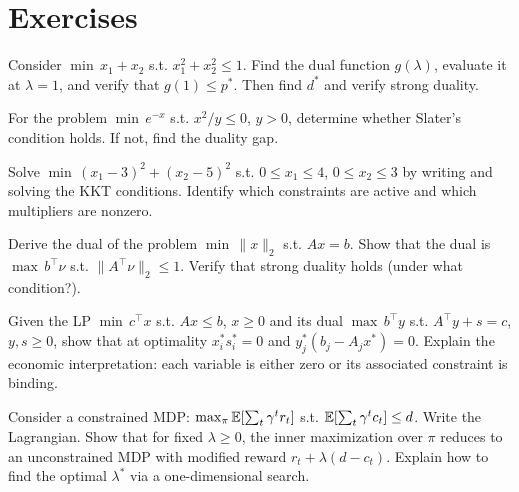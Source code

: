 \documentclass[11pt,a4paper]{article}
\begin{document}

\section{Exercises}\label{sec:exercises}

\begin{exercise}\label{ex:wd-bound}
Consider $\min\, x_1 + x_2$ s.t. $x_1^2 + x_2^2 \le 1$. Find the dual
function $g(\lambda)$, evaluate it at $\lambda = 1$, and verify that
$g(1) \le p^*$. Then find $d^*$ and verify strong duality.
\end{exercise}

\begin{exercise}\label{ex:slater-check}
For the problem $\min\, e^{-x}$ s.t. $x^2/y \le 0$, $y > 0$, determine
whether Slater's condition holds. If not, find the duality gap.
\end{exercise}

\begin{exercise}\label{ex:kkt-box}
Solve $\min\, (x_1 - 3)^2 + (x_2 - 5)^2$ s.t. $0 \le x_1 \le 4$,
$0 \le x_2 \le 3$ by writing and solving the KKT conditions. Identify
which constraints are active and which multipliers are nonzero.
\end{exercise}

\begin{exercise}\label{ex:dual-norm}
Derive the dual of the problem $\min\, \|x\|_2$ s.t. $Ax = b$.
Show that the dual is $\max\, b^\top \nu$ s.t. $\|A^\top \nu\|_2 \le 1$.
Verify that strong duality holds (under what condition?).
\end{exercise}

\begin{exercise}\label{ex:cs-lp}
Given the LP $\min\, c^\top x$ s.t. $Ax \le b$, $x \ge 0$ and its dual
$\max\, b^\top y$ s.t. $A^\top y + s = c$, $y, s \ge 0$, show that at
optimality $x_i^* s_i^* = 0$ and $y_j^*(b_j - A_j x^*) = 0$. Explain the
economic interpretation: each variable is either zero or its associated
constraint is binding.
\end{exercise}

\begin{exercise}\label{ex:cmdp}
Consider a constrained MDP: $\max_\pi \mathbb{E}[\sum_t \gamma^t r_t]$ s.t.
$\mathbb{E}[\sum_t \gamma^t c_t] \le d$. Write the Lagrangian. Show that for
fixed $\lambda \ge 0$, the inner maximization over $\pi$ reduces to an
unconstrained MDP with modified reward $r_t + \lambda(d - c_t)$. Explain
how to find the optimal $\lambda^*$ via a one-dimensional search.
\end{exercise}
\end{document}
